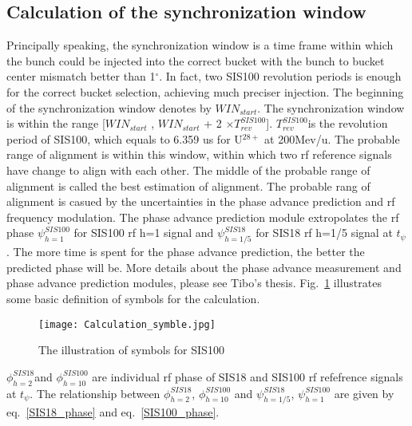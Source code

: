 \subsection{Calculation of the synchronization window}
Principally speaking, the synchronization window is a time frame within which the bunch could be injected into the correct bucket with the bunch to bucket center mismatch better than 1$^\circ$. In fact, two SIS100 revolution periods is enough for the correct bucket selection, achieving much preciser injection. The beginning of the synchronization window denotes by $WIN_{start}$. The synchronization window is within the range [$WIN_{start}$ , $WIN_{start}$  + 2 $\times T_{rev}^{SIS100}$]. $T_{rev}^{SIS100}$is the revolution period of SIS100, which equals to 6.359 us for U$^{28+}$ at 200Mev/u. The probable range of alignment is within this window, within which two rf reference signals have change to align with each other. The middle of the probable range of alignment is called the best estimation of alignment. The probable rang of alignment is casued by the uncertainties in the phase advance prediction and rf frequency modulation. The phase advance prediction module extropolates the rf phase $\psi_{h=1}^{SIS100}$ for SIS100 rf h=1 signal and $\psi_{h=1/5}^{SIS18}$ for SIS18 rf h=1/5 signal at $t_{\psi}$. The more time is spent for the phase advance prediction, the better the predicted phase will be. More details about the phase advance measurement and phase advance prediction modules, please see Tibo's thesis. Fig.~\ref{Calculation_symble} illustrates some basic definition of symbols for the calculation. 
\begin{figure}[!htb]
   \centering   
   \texttt{[image: Calculation\_symble.jpg]}
   \caption{The illustration of symbols for SIS100}
   \label{Calculation_symble}
\end{figure}
$\phi_{h=2}^{SIS18}$and $\phi_{h=10}^{SIS100}$ are individual rf phase of SIS18 and SIS100 rf refefrence signals at $t_{\psi}$. The relationship between $\phi_{h=2}^{SIS18}$, $\phi_{h=10}^{SIS100}$ and $\psi_{h=1/5}^{SIS18}$, $\psi_{h=1}^{SIS100}$ are given by eq.~\ref{SIS18_phase} and eq.~\ref{SIS100_phase}. 


